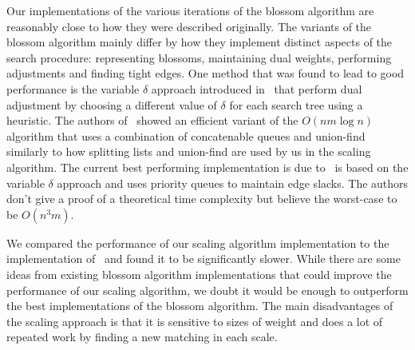 Our implementations of the various iterations of the blossom algorithm are reasonably close to how they were described originally. The variants of the blossom algorithm mainly differ by how they implement distinct aspects of the search procedure: representing blossoms, maintaining dual weights, performing adjustments and finding tight edges. One method that was found to lead to good performance is the variable $\delta$ approach introduced in~\cite{cook1999computing} that perform dual adjustment by choosing a different value of $\delta$ for each search tree using a heuristic. The authors of~\cite{mehlhorn2002implementation} showed an efficient variant of the $O(nm \log n)$ algorithm that uses a combination of concatenable queues and union-find similarly to how splitting lists and union-find are used by us in the scaling algorithm. The current best performing implementation is due to~\cite{kolmogorov2009blossom} is based on the variable $\delta$ approach and uses priority queues to maintain edge slacks. The authors don't give a proof of a theoretical time complexity but believe the worst-case to be $O(n^3m)$.

We compared the performance of our scaling algorithm implementation to the implementation of~\cite{kolmogorov2009blossom} and found it to be significantly slower. While there are some ideas from existing blossom algorithm implementations that could improve the performance of our scaling algorithm, we doubt it would be enough to outperform the best implementations of the blossom algorithm. The main disadvantages of the scaling approach is that it is sensitive to sizes of weight and does a lot of repeated work by finding a new matching in each scale.
